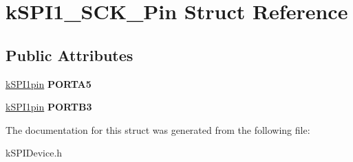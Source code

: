 \hypertarget{structkSPI1__SCK__Pin}{}\section{k\+S\+P\+I1\+\_\+\+S\+C\+K\+\_\+\+Pin Struct Reference}
\label{structkSPI1__SCK__Pin}
\subsection*{Public Attributes}
\begin{DoxyCompactItemize}
\item 
\hyperlink{structkSPI1pin}{k\+S\+P\+I1pin} {\bfseries P\+O\+R\+T\+A5}\hypertarget{structkSPI1__SCK__Pin_a04f1a5d6e5a2339851fc1259b4fcd90e}{}\label{structkSPI1__SCK__Pin_a04f1a5d6e5a2339851fc1259b4fcd90e}

\item 
\hyperlink{structkSPI1pin}{k\+S\+P\+I1pin} {\bfseries P\+O\+R\+T\+B3}\hypertarget{structkSPI1__SCK__Pin_a662a38a8964e8dad2ee4fc6d63034a7e}{}\label{structkSPI1__SCK__Pin_a662a38a8964e8dad2ee4fc6d63034a7e}

\end{DoxyCompactItemize}


The documentation for this struct was generated from the following file\+:\begin{DoxyCompactItemize}
\item 
k\+S\+P\+I\+Device.\+h\end{DoxyCompactItemize}
